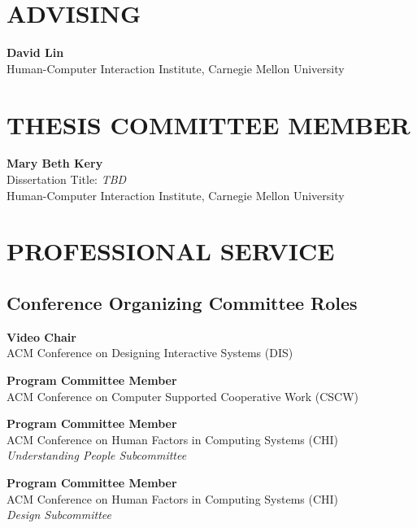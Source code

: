 \documentclass[11pt]{article} %
\begin{document}
\section*{\uppercase{Advising}}
 \textbf{David Lin}\\
Human-Computer Interaction Institute, Carnegie Mellon University


\section*{\uppercase{Thesis committee member}}
 \textbf{Mary Beth Kery}\\
Dissertation Title: \textit{TBD}\\
Human-Computer Interaction Institute, Carnegie Mellon University


\section*{\uppercase{Professional Service}}
\subsection*{Conference Organizing Committee Roles}
 \textbf{Video Chair}\\
ACM Conference on Designing Interactive Systems (DIS)
\medskip

 \textbf{Program Committee Member }\\
ACM Conference on Computer Supported Cooperative Work (CSCW)
\medskip

 \textbf{Program Committee Member}\\
ACM Conference on Human Factors in Computing Systems (CHI)\\ 
\textit{Understanding People Subcommittee }
\medskip

 \textbf{Program Committee Member}\\
ACM Conference on Human Factors in Computing Systems (CHI)\\
\textit{Design Subcommittee }
\medskip
\end{document}
